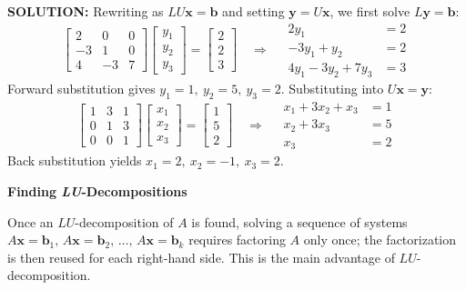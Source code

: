 \documentclass{article}
\newcommand{\redheading}[1]{{\vspace{2mm}\noindent\Large\bfseries\color{red!55!black} #1\par}\vspace{2mm}}
\begin{document}
\textbf{SOLUTION:} Rewriting as $LU\mathbf{x}=\mathbf{b}$ and setting $\mathbf{y}=U\mathbf{x}$, we first solve $L\mathbf{y}=\mathbf{b}$:
\[
  \begin{bmatrix}2&0&0\\-3&1&0\\4&-3&7\end{bmatrix}
  \begin{bmatrix}y_1\\y_2\\y_3\end{bmatrix}
  =\begin{bmatrix}2\\2\\3\end{bmatrix}
  \quad\Longrightarrow\quad
  \begin{aligned}
    2y_1 &= 2\\
    -3y_1 + y_2 &= 2\\
    4y_1 - 3y_2 + 7y_3 &= 3
  \end{aligned}
\]
Forward substitution gives $y_1=1,\ y_2=5,\ y_3=2$.
Substituting into $U\mathbf{x}=\mathbf{y}$:
\[
  \begin{bmatrix}1&3&1\\0&1&3\\0&0&1\end{bmatrix}
  \begin{bmatrix}x_1\\x_2\\x_3\end{bmatrix}
  =\begin{bmatrix}1\\5\\2\end{bmatrix}
  \quad\Longrightarrow\quad
  \begin{aligned}
    x_1+3x_2+x_3 &= 1\\
    x_2+3x_3 &= 5\\
    x_3 &= 2
  \end{aligned}
\]
Back substitution yields $x_1=2,\ x_2=-1,\ x_3=2$.

\vspace{2mm}
\redheading{Finding \textit{LU}-Decompositions}

Once an $LU$-decomposition of $A$ is found, solving a sequence of systems
$A\mathbf{x}=\mathbf{b}_1,\,A\mathbf{x}=\mathbf{b}_2,\,\ldots,\,A\mathbf{x}=\mathbf{b}_k$
requires factoring $A$ only once; the factorization is then reused for each right-hand side.
This is the main advantage of $LU$-decomposition.
\end{document}
